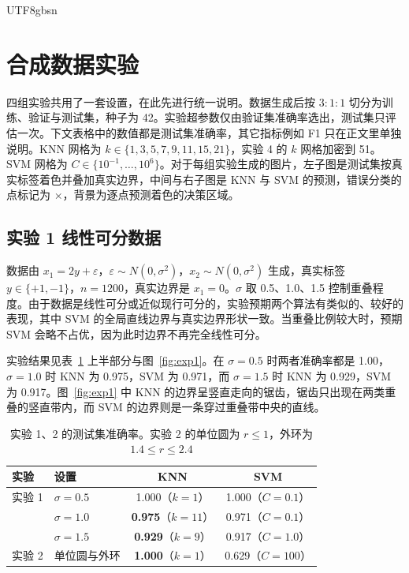 \documentclass{article}
\begin{document}
\begin{CJK}{UTF8}{gbsn}
\section{合成数据实验}

四组实验共用了一套设置，在此先进行统一说明。数据生成后按 $3{:}1{:}1$ 切分为训练、验证与测试集，种子为 42。实验超参数仅由验证集准确率选出，测试集只评估一次。下文表格中的数值都是测试集准确率，其它指标例如 F1 只在正文里单独说明。KNN 网格为 $k\in\{1,3,5,7,9,11,15,21\}$，实验 4 的 $k$ 网格加密到 51。SVM 网格为 $C\in\{10^{-1},\dots,10^{6}\}$。对于每组实验生成的图片，左子图是测试集按真实标签着色并叠加真实边界，中间与右子图是 KNN 与 SVM 的预测，错误分类的点标记为 $\times$，背景为逐点预测着色的决策区域。

\subsection{实验 1 \quad 线性可分数据}

数据由 $x_1=2y+\varepsilon$，$\varepsilon\sim N(0,\sigma^2)$，$x_2\sim N(0,\sigma^2)$ 生成，真实标签 $y \in \{+1, -1\}$，$n=1200$，真实边界是 $x_1=0$。$\sigma$ 取 0.5、1.0、1.5 控制重叠程度。由于数据是线性可分或近似现行可分的，实验预期两个算法有类似的、较好的表现，其中 SVM 的全局直线边界与真实边界形状一致。当重叠比例较大时，预期 SVM 会略不占优，因为此时边界不再完全线性可分。

实验结果见表~\ref{tab:syn12} 上半部分与图~\ref{fig:exp1}。在 $\sigma=0.5$ 时两者准确率都是 1.00，$\sigma=1.0$ 时 KNN 为 0.975，SVM 为 0.971，而 $\sigma=1.5$ 时 KNN 为 0.929，SVM 为 0.917。图~\ref{fig:exp1} 中 KNN 的边界呈竖直走向的锯齿，锯齿只出现在两类重叠的竖直带内，而 SVM 的边界则是一条穿过重叠带中央的直线。

\begin{table}[t]
\centering
\caption{实验 1、2 的测试集准确率。实验 2 的单位圆为 $r\le1$，外环为 $1.4\le r\le2.4$}
\label{tab:syn12}
\normalsize
\begin{tabular}{@{}llcc@{}}
\toprule
实验 & 设置 & KNN & SVM \\
\midrule
实验 1 & $\sigma=0.5$ & 1.000（$k{=}1$） & 1.000（$C{=}0.1$） \\
       & $\sigma=1.0$ & \textbf{0.975}（$k{=}11$） & 0.971（$C{=}0.1$） \\
       & $\sigma=1.5$ & \textbf{0.929}（$k{=}9$） & 0.917（$C{=}1.0$） \\
\midrule
实验 2 & 单位圆与外环 & \textbf{1.000}（$k{=}1$） & 0.629（$C{=}100$） \\
\bottomrule
\end{tabular}
\end{table}


\end{CJK}
\end{document}
